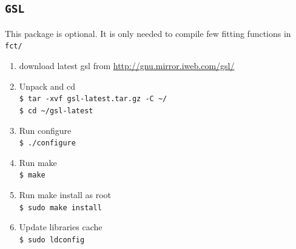 \documentclass[10pt,letterpaper,oneside]{article}
\newcommand{\gsl}{\texttt{GSL}}
\begin{document}
\subsection{\gsl}
This package is optional. It is only needed to compile
few fitting functions in \verb+fct/+
\begin{enumerate}
 \item  download latest gsl from \url{http://gnu.mirror.iweb.com/gsl/}

 \item Unpack and cd
  \\  \verb+$ tar -xvf gsl-latest.tar.gz -C ~/+
  \\  \verb+$ cd ~/gsl-latest+

 \item  Run configure
  \\  \verb+$ ./configure+

 \item  Run make
  \\  \verb+$ make+

 \item  Run make install as root
  \\  \verb+$ sudo make install+

 \item  Update libraries cache
  \\  \verb+$ sudo ldconfig+
\end{enumerate}
\end{document}

